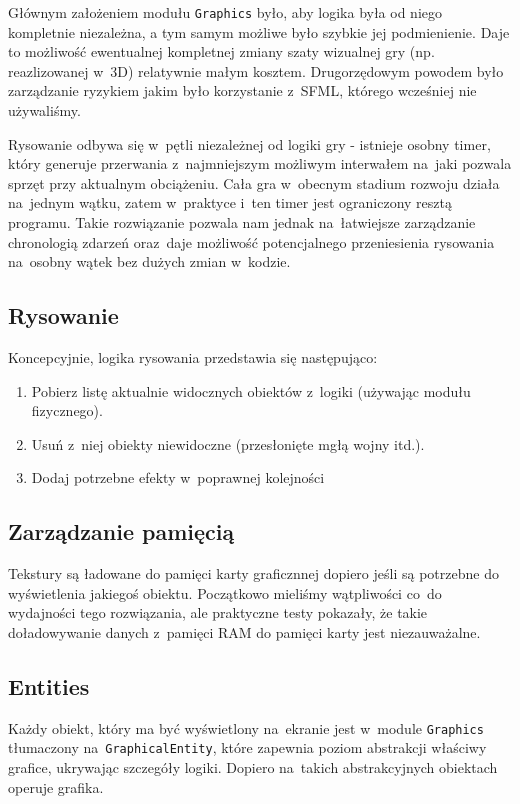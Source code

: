 \documentclass[licencjacka]{pracamgr}
\begin{document}
    Głównym założeniem modułu \texttt{Graphics} było, aby logika była od niego kompletnie niezależna, a tym samym możliwe
    było szybkie jej podmienienie. Daje to możliwość ewentualnej kompletnej zmiany szaty wizualnej gry (np. reazlizowanej w~3D)
    relatywnie małym kosztem. Drugorzędowym powodem było zarządzanie ryzykiem jakim było korzystanie z~SFML, którego wcześniej
    nie używaliśmy.

    Rysowanie odbywa się w~pętli niezależnej od logiki gry - istnieje osobny timer, który generuje
    przerwania z~najmniejszym możliwym interwałem na~jaki pozwala sprzęt przy aktualnym obciążeniu. Cała gra w~obecnym
    stadium rozwoju działa na~jednym wątku, zatem w~praktyce i~ten timer jest ograniczony resztą programu. Takie
    rozwiązanie pozwala nam jednak na~łatwiejsze zarządzanie chronologią zdarzeń oraz~daje możliwość potencjalnego
    przeniesienia rysowania na~osobny wątek bez dużych zmian w~kodzie.

    \subsection{Rysowanie}
      Koncepcyjnie, logika rysowania przedstawia się następująco:
      \begin{enumerate}
       \item Pobierz listę aktualnie widocznych obiektów z~logiki (używając modułu fizycznego).
       \item Usuń z~niej obiekty niewidoczne (przesłonięte mgłą wojny itd.).
       \item Dodaj potrzebne efekty w~poprawnej kolejności
      \end{enumerate}

    \subsection{Zarządzanie pamięcią}
      Tekstury są ładowane do pamięci karty graficznnej dopiero jeśli są potrzebne do wyświetlenia jakiegoś
      obiektu. Początkowo mieliśmy wątpliwości co~do wydajności tego rozwiązania, ale praktyczne testy pokazały, że
      takie doładowywanie danych z~pamięci RAM do pamięci karty jest niezauważalne.

    \subsection{Entities}
      Każdy obiekt, który ma być wyświetlony na~ekranie jest w~module \texttt{Graphics} tłumaczony na~\texttt{GraphicalEntity}, które
      zapewnia poziom abstrakcji właściwy grafice, ukrywając szczegóły logiki. Dopiero na~takich abstrakcyjnych obiektach operuje grafika.
\end{document}
